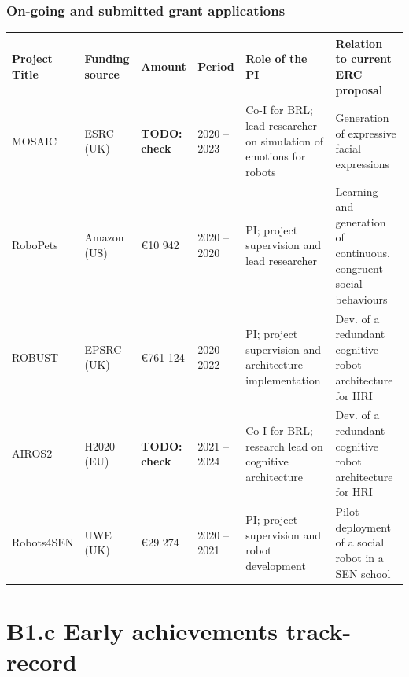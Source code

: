 \documentclass[11pt,a4paper]{report}
\newcommand{\TODO}[1]{{\color{red}\textbf{TODO: #1}}}
\newcommand{\eu}[1]{}
\begin{document}
\subsection{On-going and submitted grant applications}

\begin{tabular}{llllp{4cm}p{4cm}}
\toprule
\textbf{Project Title} & \textbf{Funding source} & \textbf{Amount} & \textbf{Period} & \textbf{Role of the PI} & \textbf{Relation to current  ERC proposal} \\ \midrule
    MOSAIC & ESRC (UK) & \TODO{check} & 2020 -- 2023 & Co-I for BRL; lead researcher on simulation of emotions for robots & Generation of expressive facial expressions \\ \midrule
    RoboPets & Amazon (US) & €10 942 & 2020 -- 2020 & PI; project supervision and lead researcher & Learning and generation of continuous, congruent social behaviours \\ \midrule
    ROBUST & EPSRC (UK) & €761 124 & 2020 -- 2022 & PI; project supervision and
    architecture implementation & Dev. of a redundant cognitive robot architecture for HRI \\ \midrule
    AIROS2 & H2020 (EU) & \TODO{check} & 2021 -- 2024 & Co-I for BRL; research
    lead on cognitive architecture & Dev. of a redundant cognitive robot architecture for HRI \\ \midrule
    Robots4SEN & UWE (UK) & €29 274 & 2020 -- 2021 & PI; project supervision and robot development & Pilot deployment of a social robot in a SEN school \\ \bottomrule
\end{tabular}




\newpage
\chapter{B1.c Early achievements track-record}\label{early-achievements-track-record}

\eu{should list your important achievements,
including your most important publications (up to five for Starting Grant and up to ten for
Consolidator Grant) highlighting those as main author and/or without the co-authorship of your PhD
supervisor. The publications should be properly referenced, including all authors in the published
order (Please see section 1.1 on Research integrity). Field relevant bibliometric indicators as well as
research monographs and any translations thereof may also be included. If applicable include:
granted patent(s); invited presentations to internationally established conferences and/or
international advanced schools; Prizes/Awards/Academy memberships etc.}
\eu{(max 2 pages)}
\end{document}

